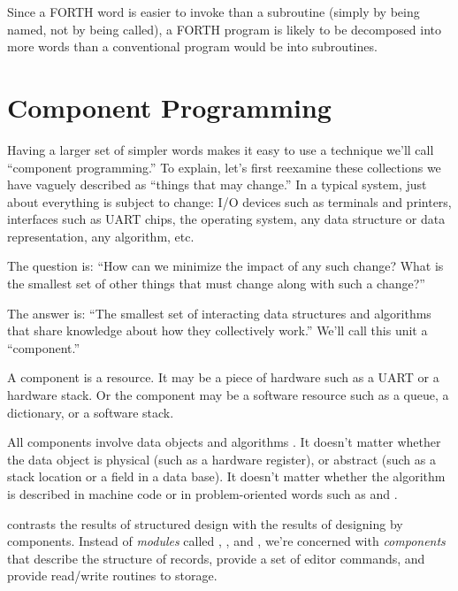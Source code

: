 Since a FORTH word is easier to invoke than a subroutine (simply by
being named, not by being called), a FORTH program is likely to be
decomposed into more words than a conventional program would be into
subroutines.


\section{Component Programming}
Having a larger set of simpler words makes it easy to use a technique
we'll call ``component programming.'' To explain, let's first
reexamine these collections we have vaguely described as ``things that
may change.'' In a typical system, just about everything is subject to
change: I/O devices such as terminals and printers, interfaces such as
UART chips, the operating system, any data structure or data
representation, any algorithm, etc.

The question is: ``How can we minimize the impact of any such change?
What is the smallest set of other things that must change along with
such a change?''

The answer is: ``The smallest set of interacting data structures and
algorithms
that share knowledge about how they collectively work.'' We'll call
this unit a ``component.''

A component is a resource. It may be a piece of hardware such as a
UART or a hardware stack. Or the component may be a software resource
such as a queue, a dictionary, or a software stack.

All components involve data objects and algorithms
.
It doesn't matter whether the data object is physical (such as a
hardware register), or abstract (such as a stack location or a field
in a data base).  It doesn't matter whether the algorithm is described
in machine code or in problem-oriented words such as 
and .


 contrasts the results of structured design with the
results of designing by components. Instead of \emph{modules} called
, , and ,
we're concerned with \emph{components} that describe the structure of
records, provide a set of editor commands, and provide read/write
routines to storage.

